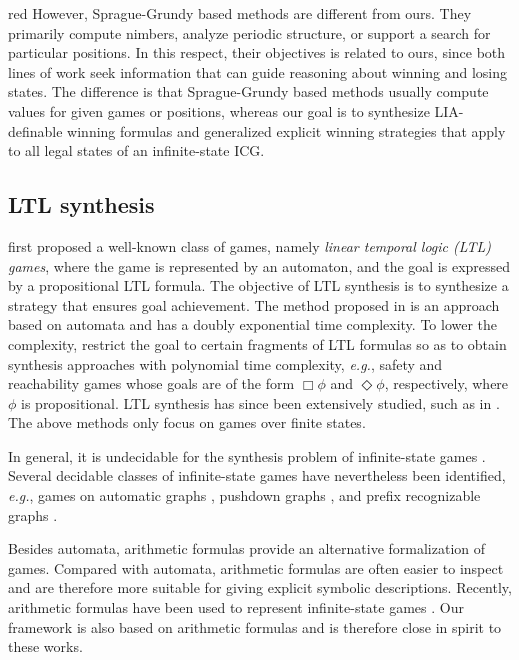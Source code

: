 \documentclass[review]{elsarticle}
\newcommand\eg{{\it e.g.}}
\begin{document}
\begin{color}{red}
However, Sprague-Grundy based methods are different from ours. 
They primarily compute nimbers, analyze periodic structure, or support a search for particular positions.
In this respect, their objectives is related to ours, since both lines of work seek information that can guide reasoning about winning and losing states.
The difference is that Sprague-Grundy based methods usually compute values for given games or positions, whereas our goal is to synthesize LIA-definable winning formulas and generalized explicit winning strategies that apply to all legal states of an infinite-state ICG.
\end{color}


\subsection{LTL synthesis}
\citet{PnuR1989} first proposed a well-known class of games, namely \textit{linear temporal logic (LTL) games}, where the game is represented by an automaton, and the goal is expressed by a propositional LTL formula.
The objective of LTL synthesis is to synthesize a strategy that ensures goal achievement.
The method proposed in \cite{PnuR1989} is an approach based on automata and has a doubly exponential time complexity.
To lower the complexity, \citet{AsaMPS1998} restrict the goal to certain fragments of LTL formulas so as to obtain synthesis approaches with polynomial time complexity, \eg, safety and reachability games whose goals are of the form $\Box \phi$ and $\Diamond \phi$, respectively, where $\phi$ is propositional.
LTL synthesis has since been extensively studied, such as in \cite{NikAN2015,ZhuTLPV2017,CamMBM2018,GiaFLVX2022,BalFR2023,KreMPR2023}.
The above methods only focus on games over finite states. 

In general, it is undecidable for the synthesis problem of infinite-state games \cite{AlfHM2001}.
Several decidable classes of infinite-state games have nevertheless been identified, \eg, games on automatic graphs \cite{NeiT2016}, pushdown graphs \cite{Cac2002,ChaF2013}, and prefix recognizable graphs \cite{Cac2003}.

Besides automata, arithmetic formulas provide an alternative formalization of games.
Compared with automata, arithmetic formulas are often easier to inspect and are therefore more suitable for giving explicit symbolic descriptions.
Recently, arithmetic formulas have been used to represent infinite-state games \cite{BeyCPR2014,FarK2018,BaiCF2021,FaeP2023}.
Our framework is also based on arithmetic formulas and is therefore close in spirit to these works. 
\end{document}
